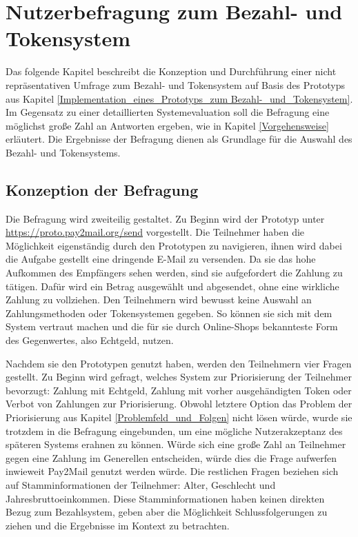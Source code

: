 
\chapter{Nutzerbefragung zum Bezahl- und Tokensystem}
\label{Nutzerbefragung_zum Bezahl-_und_Tokensystem}
Das folgende Kapitel beschreibt die Konzeption und Durchführung einer nicht repräsentativen Umfrage zum Bezahl- und Tokensystem auf Basis des Prototyps aus Kapitel \ref{Implementation_eines_Prototyps_zum Bezahl-_und_Tokensystem}. Im Gegensatz zu einer detaillierten Systemevaluation soll die Befragung eine möglichst große Zahl an Antworten ergeben, wie in Kapitel \ref{Vorgehensweise} erläutert. Die Ergebnisse der Befragung dienen als Grundlage für die Auswahl des Bezahl- und Tokensystems.

\section{Konzeption der Befragung}
Die Befragung wird zweiteilig gestaltet. Zu Beginn wird der Prototyp unter \\ \url{https://proto.pay2mail.org/send} vorgestellt. Die Teilnehmer haben die Möglichkeit eigenständig durch den Prototypen zu navigieren, ihnen wird dabei die Aufgabe gestellt eine dringende E-Mail zu versenden. Da sie das hohe Aufkommen des Empfängers sehen werden, sind sie aufgefordert die Zahlung zu tätigen. Dafür wird ein Betrag ausgewählt und abgesendet, ohne eine wirkliche Zahlung zu vollziehen. Den Teilnehmern wird bewusst keine Auswahl an Zahlungsmethoden oder Tokensystemen gegeben. So können sie sich mit dem System vertraut machen und die für sie durch Online-Shops bekannteste Form des Gegenwertes, also Echtgeld, nutzen.

Nachdem sie den Prototypen genutzt haben, werden den Teilnehmern vier Fragen gestellt. Zu Beginn wird gefragt, welches System zur Priorisierung der Teilnehmer bevorzugt: Zahlung mit Echtgeld, Zahlung mit vorher ausgehändigten Token oder Verbot von Zahlungen zur Priorisierung. Obwohl letztere Option das Problem der Priorisierung aus Kapitel \ref{Problemfeld_und_Folgen} nicht lösen würde, wurde sie trotzdem in die Befragung eingebunden, um eine mögliche Nutzerakzeptanz des späteren Systems erahnen zu können. Würde sich eine große Zahl an Teilnehmer gegen eine Zahlung im Generellen entscheiden, würde dies die Frage aufwerfen inwieweit Pay2Mail genutzt werden würde. Die restlichen Fragen beziehen sich auf Stamminformationen der Teilnehmer: Alter, Geschlecht und Jahresbruttoeinkommen. Diese Stamminformationen haben keinen direkten Bezug zum Bezahlsystem, geben aber die Möglichkeit Schlussfolgerungen zu ziehen und die Ergebnisse im Kontext zu betrachten. 


